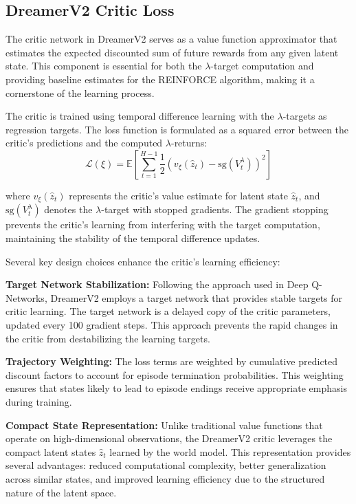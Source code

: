 \documentclass[
	english,
	ruledheaders=section,
	class=report,
	thesis={type=master},
	accentcolor=9c,
	custommargins=true,
	marginpar=false,
	parskip=half-,
	fontsize=11pt,
]{tudapub}
\begin{document}
\subsection{DreamerV2 Critic Loss}
\label{subsec:critic_loss}

The critic network in DreamerV2 serves as a value function approximator that estimates the expected discounted sum of future rewards from any given latent state. This component is essential for both the $\lambda$-target computation and providing baseline estimates for the REINFORCE algorithm, making it a cornerstone of the learning process.

The critic is trained using temporal difference learning with the $\lambda$-targets as regression targets. The loss function is formulated as a squared error between the critic's predictions and the computed $\lambda$-returns:
\begin{equation}
\mathcal{L}(\xi) = \mathbb{E}\left[\sum_{t=1}^{H-1} \frac{1}{2} \left(v_\xi(\hat{z}_t) - \text{sg}(V^{\lambda}_t)\right)^2\right]
\end{equation}

where $v_\xi(\hat{z}_t)$ represents the critic's value estimate for latent state $\hat{z}_t$, and $\text{sg}(V^{\lambda}_t)$ denotes the $\lambda$-target with stopped gradients. The gradient stopping prevents the critic's learning from interfering with the target computation, maintaining the stability of the temporal difference updates.

Several key design choices enhance the critic's learning efficiency:

\textbf{Target Network Stabilization:} Following the approach used in Deep Q-Networks, DreamerV2 employs a target network that provides stable targets for critic learning. The target network is a delayed copy of the critic parameters, updated every 100 gradient steps. This approach prevents the rapid changes in the critic from destabilizing the learning targets.

\textbf{Trajectory Weighting:} The loss terms are weighted by cumulative predicted discount factors to account for episode termination probabilities. This weighting ensures that states likely to lead to episode endings receive appropriate emphasis during training.

\textbf{Compact State Representation:} Unlike traditional value functions that operate on high-dimensional observations, the DreamerV2 critic leverages the compact latent states $\hat{z}_t$ learned by the world model. This representation provides several advantages: reduced computational complexity, better generalization across similar states, and improved learning efficiency due to the structured nature of the latent space.
\end{document}
